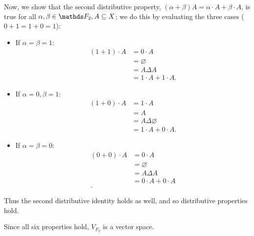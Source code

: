 \documentclass{homework}
\begin{document}
\begin{solution}
\begin{itemize}
    Now, we show that the second distributive property, $\left( \alpha+ \beta \right) A =
    \alpha\cdot A+\beta\cdot A$, is true for all $\alpha,\beta\in \F_2,A\subseteq X$; we do this by
    evaluating the three cases ($0+ 1=1+ 0=1$):
    \begin{itemize}
      \item If $\alpha=\beta=1$:
        \begin{align*}
          (1+ 1)\cdot A &= 0\cdot A \\
          &= \varnothing \\
          &= A\Delta A \\
          &= 1\cdot A+1\cdot A
        .\end{align*}
      \item If $\alpha=0,\beta=1$:
        \begin{align*}
          (1+0)\cdot A&= 1\cdot A \\
          &= A \\
          &= A\Delta\varnothing \\
          &= 1\cdot A+0\cdot A
        .\end{align*}
      \item If $\alpha=\beta=0$:
        \begin{align*}
          (0+0)\cdot A&= 0\cdot A \\
          &= \varnothing \\
          &= A\Delta A \\
          &= 0\cdot A+0\cdot A \\
        .\end{align*}
    \end{itemize}
    Thus the second distributive identity holds as well, and so distributive properties hold.

  \end{itemize}
  Since all six properties hold, $V_{F_2}$ is a vector space.
\end{solution}
\end{document}
